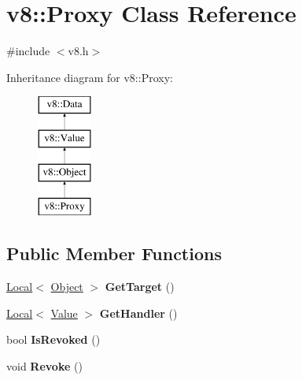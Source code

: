 \hypertarget{classv8_1_1_proxy}{}\section{v8\+:\+:Proxy Class Reference}
\label{classv8_1_1_proxy}


{\ttfamily \#include $<$v8.\+h$>$}

Inheritance diagram for v8\+:\+:Proxy\+:\begin{figure}[H]
\begin{center}
\leavevmode
\includegraphics[height=4.000000cm]{classv8_1_1_proxy}
\end{center}
\end{figure}
\subsection*{Public Member Functions}
\begin{DoxyCompactItemize}
\item 
\hyperlink{classv8_1_1_local}{Local}$<$ \hyperlink{classv8_1_1_object}{Object} $>$ {\bfseries Get\+Target} ()\hypertarget{classv8_1_1_proxy_adfb658a509cc0ff5361e22cff6a545d3}{}\label{classv8_1_1_proxy_adfb658a509cc0ff5361e22cff6a545d3}

\item 
\hyperlink{classv8_1_1_local}{Local}$<$ \hyperlink{classv8_1_1_value}{Value} $>$ {\bfseries Get\+Handler} ()\hypertarget{classv8_1_1_proxy_a19abaf64953263b26f81191eec00e5f5}{}\label{classv8_1_1_proxy_a19abaf64953263b26f81191eec00e5f5}

\item 
bool {\bfseries Is\+Revoked} ()\hypertarget{classv8_1_1_proxy_ad6100ff322bd5b0297deea20237ff065}{}\label{classv8_1_1_proxy_ad6100ff322bd5b0297deea20237ff065}

\item 
void {\bfseries Revoke} ()\hypertarget{classv8_1_1_proxy_a24a05c4dc89a74406456df8c14adff7e}{}\label{classv8_1_1_proxy_a24a05c4dc89a74406456df8c14adff7e}

\end{DoxyCompactItemize}

